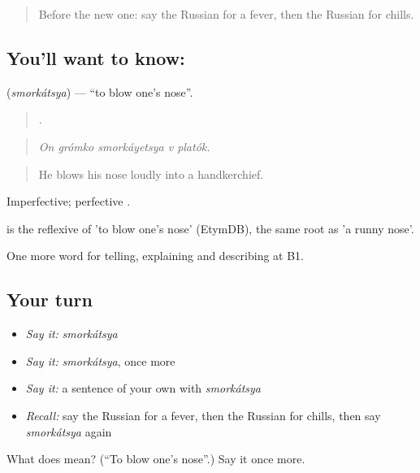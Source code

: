 \begin{quote}
Before the new one: say the Russian for a fever, then the Russian for chills.
\end{quote}

\subsection*{You'll want to know: }
\textbf{} (\emph{smorkátsya}) — \textquotedblleft{}to blow one's nose\textquotedblright{}.

\begin{quote}
    .
\end{quote}

\begin{quote}
\emph{On grómko smorkáyetsya v platók.}
\end{quote}

\begin{quote}
He blows his nose loudly into a handkerchief.
\end{quote}

Imperfective; perfective .

\begin{cousinweb}
\emph{} is the reflexive of \emph{} 'to blow one's nose' (EtymDB), the same root as \emph{} 'a runny nose'.
\end{cousinweb}

\begin{grammarlens}[title={What you've built}]
One more word for telling, explaining and describing at B1.
\end{grammarlens}

\subsection*{Your turn}
\begin{itemize}
\raggedright
  \item \emph{Say it:} \emph{smorkátsya}
  \item \emph{Say it:} \emph{smorkátsya}, once more
  \item \emph{Say it:} a sentence of your own with \emph{smorkátsya}
  \item \emph{Recall:} say the Russian for a fever, then the Russian for chills, then say \emph{smorkátsya} again
\end{itemize}

\begin{tcolorbox}[breakable,colback=teal!4,colframe=teal!35!black,title={Before you move on}]
What does  mean? (\textquotedblleft{}To blow one's nose\textquotedblright{}.) Say it once more.
\end{tcolorbox}
